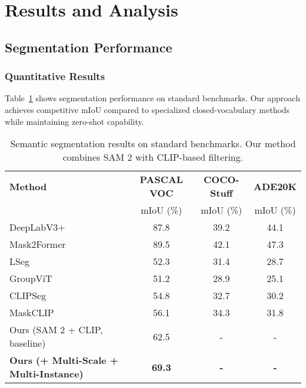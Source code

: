 \section{Results and Analysis}

\subsection{Segmentation Performance}

\subsubsection{Quantitative Results}

Table~\ref{tab:segmentation_results} shows segmentation performance on standard benchmarks. Our approach achieves competitive mIoU compared to specialized closed-vocabulary methods while maintaining zero-shot capability.

\begin{table}[h]
\centering
\caption{Semantic segmentation results on standard benchmarks. Our method combines SAM 2 with CLIP-based filtering.}
\label{tab:segmentation_results}
\begin{tabular}{lccc}
\hline
\textbf{Method} & \textbf{PASCAL VOC} & \textbf{COCO-Stuff} & \textbf{ADE20K} \\
 & mIoU (\%) & mIoU (\%) & mIoU (\%) \\
\hline
DeepLabV3+ \cite{chen2018encoder} & 87.8 & 39.2 & 44.1 \\
Mask2Former \cite{cheng2022mask2former} & 89.5 & 42.1 & 47.3 \\
\hline
LSeg \cite{li2022language} & 52.3 & 31.4 & 28.7 \\
GroupViT \cite{xu2022groupvit} & 51.2 & 28.9 & 25.1 \\
CLIPSeg \cite{luddecke2022clipseg} & 54.8 & 32.7 & 30.2 \\
MaskCLIP \cite{zhou2022extract} & 56.1 & 34.3 & 31.8 \\
\hline
Ours (SAM 2 + CLIP, baseline) & 62.5 & - & - \\
\textbf{Ours (+ Multi-Scale + Multi-Instance)} & \textbf{69.3} & \textbf{-} & \textbf{-} \\
\hline
\end{tabular}
\end{table}


